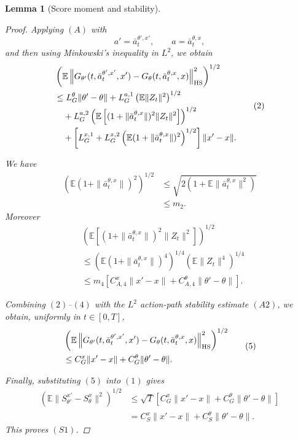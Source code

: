 \documentclass{article}
\newtheorem{lem}[thm]{Lemma}
\theoremstyle{definition}
\theoremstyle{remark}
\theoremstyle{mystyle}
\newcommand{\1}{\mathbbm{1}}
\begin{document}
\begin{lem}[Score moment and stability]
\begin{proof}
Applying \((A)\) with
\[
a'=\bar a_t^{\theta',x'},
\qquad
a=\bar a_t^{\theta,x},
\]
and then using Minkowski's inequality in \(L^2\), we obtain
\[
\begin{aligned}
&
\left(
\mathbb E
\left\|
G_{\theta'}(t,\bar a_t^{\theta',x'},x')
-
G_\theta(t,\bar a_t^{\theta,x},x)
\right\|_{\rm HS}^2
\right)^{1/2}\\
&\le
L_G^\theta\|\theta'-\theta\|
+
L_G^{a,1}
\left(\mathbb E\|Z_t\|^2\right)^{1/2}\\
&\quad+
L_G^{a,2}
\left(
\mathbb E
\left[
(1+\|\bar a_t^{\theta,x}\|)^2
\|Z_t\|^2
\right]
\right)^{1/2}\\
&\quad+
\left[
L_G^{x,1}
+
L_G^{x,2}
\left(
\mathbb E
(1+\|\bar a_t^{\theta,x}\|)^2
\right)^{1/2}
\right]\|x'-x\|.
\end{aligned}
\tag{2}
\]

We have
\[
\begin{aligned}
\left(
\mathbb E
(1+\|\bar a_t^{\theta,x}\|)^2
\right)^{1/2}
&\le
\sqrt{
2\left(
1+\mathbb E\|\bar a_t^{\theta,x}\|^2
\right)
}\\
&\le
m_2.
\end{aligned}
\tag{3}
\]
Moreover
\[
\begin{aligned}
&
\left(
\mathbb E
\left[
(1+\|\bar a_t^{\theta,x}\|)^2
\|Z_t\|^2
\right]
\right)^{1/2}\\
&\le
\left(
\mathbb E
(1+\|\bar a_t^{\theta,x}\|)^4
\right)^{1/4}
\left(
\mathbb E\|Z_t\|^4
\right)^{1/4}\\
&\le
m_4
\left[
C_{A,4}^x\|x'-x\|
+
C_{A,4}^\theta\|\theta'-\theta\|
\right].
\end{aligned}
\tag{4}
\]


Combining \((2)\)--\((4)\) with the \(L^2\) action-path stability
estimate \((A2)\), we obtain, uniformly in \(t\in[0,T]\),
\[
\begin{aligned}
&
\left(
\mathbb E
\left\|
G_{\theta'}(t,\bar a_t^{\theta',x'},x')
-
G_\theta(t,\bar a_t^{\theta,x},x)
\right\|_{\rm HS}^2
\right)^{1/2}\\
&\le
C_G^x\|x'-x\|
+
C_G^\theta\|\theta'-\theta\|.
\end{aligned}
\tag{5}
\]

Finally, substituting \((5)\) into \((1)\) gives
\[
\begin{aligned}
\left(
\mathbb E
\|S_{\theta'}^{x'}-S_\theta^x\|^2
\right)^{1/2}
&\le
\sqrt{T}
\left[
C_G^x\|x'-x\|
+
C_G^\theta\|\theta'-\theta\|
\right]\\
&=
C_S^x\|x'-x\|
+
C_S^\theta\|\theta'-\theta\|.
\end{aligned}
\]
This proves \((S1)\).
\end{proof}
\end{lem}
\end{document}
